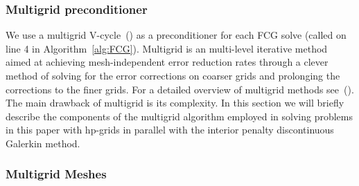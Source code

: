 \subsubsection{Multigrid preconditioner}


We use a multigrid V-cycle~(\cite{briggs2000multigrid}) as a preconditioner for each
FCG solve (called on line 4 in Algorithm~\ref{alg:FCG}). 
Multigrid is an multi-level iterative method aimed at achieving
mesh-independent error reduction rates through a clever method of
solving for the error corrections on coarser grids and prolonging the
corrections to the finer grids. For a detailed overview of multigrid
methods see~(\cite{briggs2000multigrid}). The main drawback of multigrid
is its complexity. In this section we will briefly describe the
components of the multigrid algorithm employed in solving problems in
this paper with hp-grids in parallel with the interior penalty
discontinuous Galerkin method.

\subsubsection{Multigrid Meshes}
\label{sec:MultigridMeshes}

